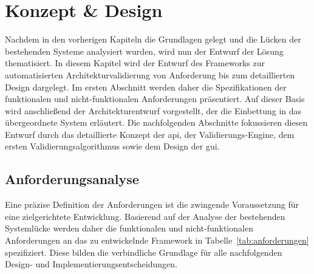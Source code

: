 
\chapter{Konzept \& Design}
\label{ch:KuD}

Nachdem in den vorherigen Kapiteln die Grundlagen gelegt und die Lücken der bestehenden Systeme analysiert wurden, wird nun der Entwurf der Lösung thematisiert. In diesem Kapitel wird der Entwurf des Frameworks zur automatisierten Architekturvalidierung von Anforderung bis zum detaillierten Design dargelegt. Im ersten Abschnitt werden daher die Spezifikationen der funktionalen und nicht-funktionalen Anforderungen präsentiert. Auf dieser Basis wird anschließend der Architekturentwurf vorgestellt, der die Einbettung in das übergeordnete System erläutert. Die nachfolgenden Abschnitte fokussieren diesen Entwurf durch das detaillierte Konzept der \gls{api}, der Validierungs-Engine, dem ersten Validierungsalgorithmus sowie dem Design der \gls{gui}.


\section{Anforderungsanalyse}
\label{sec:Anforderungsanalyse}

Eine präzise Definition der Anforderungen ist die zwingende Voraussetzung für eine zielgerichtete Entwicklung. Basierend auf der Analyse der bestehenden Systemlücke werden daher die funktionalen und nicht-funktionalen Anforderungen an das zu entwickelnde Framework in Tabelle~\ref{tab:anforderungen} spezifiziert. Diese bilden die verbindliche Grundlage für alle nachfolgenden Design- und Implementierungsentscheidungen.

